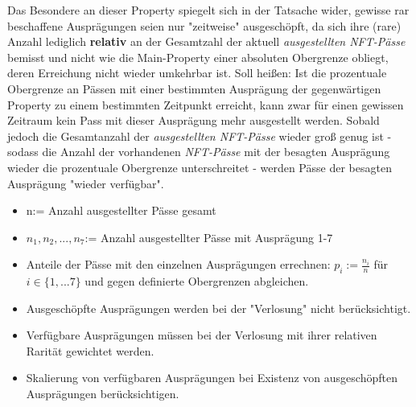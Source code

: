 \vspace{0.3cm}

Das Besondere an dieser Property spiegelt sich in der Tatsache wider, gewisse rar beschaffene Ausprägungen seien nur "zeitweise" ausgeschöpft, da sich ihre (rare) Anzahl lediglich \textbf{relativ} an der Gesamtzahl der aktuell \textit{ausgestellten NFT-Pässe} bemisst und nicht wie die Main-Property einer absoluten Obergrenze obliegt, deren Erreichung nicht wieder umkehrbar ist. Soll heißen: Ist die prozentuale Obergrenze an Pässen mit einer bestimmten Ausprägung der gegenwärtigen Property zu einem bestimmten Zeitpunkt erreicht, kann zwar für einen gewissen Zeitraum kein Pass mit dieser Ausprägung mehr ausgestellt werden. Sobald jedoch die Gesamtanzahl der \textit{ausgestellten NFT-Pässe} wieder groß genug ist - sodass die Anzahl der vorhandenen \textit{NFT-Pässe} mit der besagten Ausprägung wieder die prozentuale Obergrenze unterschreitet - werden Pässe der besagten Ausprägung "wieder verfügbar".

\vspace{0.3cm}


\begin{itemize}
    \item n:= Anzahl ausgestellter Pässe gesamt
    \item $n_1, n_2,...,n_7$:= Anzahl ausgestellter Pässe mit Ausprägung 1-7
    \item Anteile der Pässe mit den einzelnen Ausprägungen errechnen: $p_i:= \frac{n_i}{n}$ für $i \in \lbrace 1,...7 \rbrace$ und gegen definierte Obergrenzen abgleichen.
    \item Ausgeschöpfte Ausprägungen werden bei der "Verlosung" nicht berücksichtigt.
    \item Verfügbare Ausprägungen müssen bei der Verlosung mit ihrer relativen Rarität gewichtet werden.
    \item Skalierung von verfügbaren Ausprägungen bei Existenz von ausgeschöpften Ausprägungen berücksichtigen.
\end{itemize}

\vspace{0.5cm}

